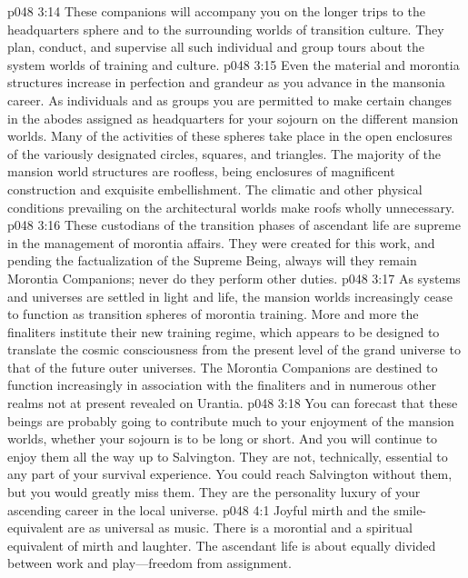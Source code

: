 \pc \vs p048 3:14 \bibnobreakspace {} These companions will accompany you on the longer trips to the headquarters sphere and to the surrounding worlds of transition culture. They plan, conduct, and supervise all such individual and group tours about the system worlds of training and culture.
\pc \vs p048 3:15 \bibnobreakspace {} Even the material and morontia structures increase in perfection and grandeur as you advance in the mansonia career. As individuals and as groups you are permitted to make certain changes in the abodes assigned as headquarters for your sojourn on the different mansion worlds. Many of the activities of these spheres take place in the open enclosures of the variously designated circles, squares, and triangles. The majority of the mansion world structures are roofless, being enclosures of magnificent construction and exquisite embellishment. The climatic and other physical conditions prevailing on the architectural worlds make roofs wholly unnecessary.
\pc \vs p048 3:16 These custodians of the transition phases of ascendant life are supreme in the management of morontia affairs. They were created for this work, and pending the factualization of the Supreme Being, always will they remain Morontia Companions; never do they perform other duties.
\vs p048 3:17 As systems and universes are settled in light and life, the mansion worlds increasingly cease to function as transition spheres of morontia training. More and more the finaliters institute their new training regime, which appears to be designed to translate the cosmic consciousness from the present level of the grand universe to that of the future outer universes. The Morontia Companions are destined to function increasingly in association with the finaliters and in numerous other realms not at present revealed on Urantia.
\vs p048 3:18 You can forecast that these beings are probably going to contribute much to your enjoyment of the mansion worlds, whether your sojourn is to be long or short. And you will continue to enjoy them all the way up to Salvington. They are not, technically, essential to any part of your survival experience. You could reach Salvington without them, but you would greatly miss them. They are the personality luxury of your ascending career in the local universe.
\vs p048 4:1 Joyful mirth and the smile\hyp{}equivalent are as universal as music. There is a morontial and a spiritual equivalent of mirth and laughter. The ascendant life is about equally divided between work and play---freedom from assignment.
